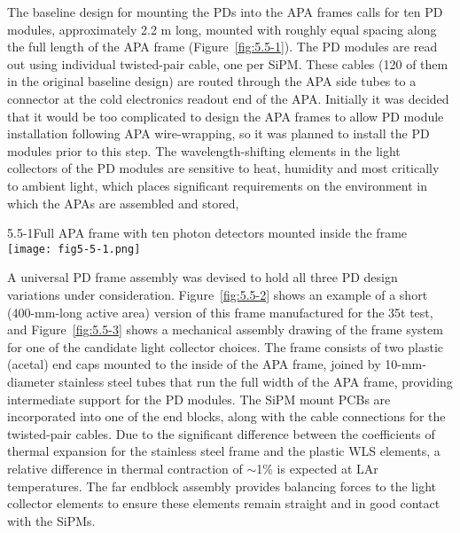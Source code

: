 The baseline  design for mounting the PDs into the APA frames calls for
ten PD modules, approximately 2.2 m long, mounted with roughly equal
spacing along the full length of the APA frame (Figure~\ref{fig:5.5-1}).  The
PD modules are read out using individual twisted-pair cable, one per
SiPM.  These cables (120 of them in the original baseline  design) are
routed through the APA side tubes to a connector at the cold
electronics readout end of the APA.  Initially it was decided that it
would be too complicated to design the APA frames to allow PD module
installation following APA wire-wrapping, so it was planned to install 
the PD modules %
prior to this step.%
The
wavelength-shifting elements in the light collectors of the PD modules
are sensitive to heat, humidity and most critically to %
ambient light, which places significant requirements  on the
environment in which the APAs are assembled and stored,%

\begin{cdrfigure}{5.5-1}{Full APA frame with ten photon detectors mounted
  inside the frame}
   \texttt{[image: fig5-5-1.png]}
\end{cdrfigure}

A universal PD frame assembly was devised to hold all three PD design
variations under consideration.  Figure~\ref{fig:5.5-2} shows an example of a
short (400-mm-long active area) version of this frame manufactured for
the 35t test,  and Figure~\ref{fig:5.5-3} shows a mechanical assembly drawing of
the frame system for one of the candidate light collector choices.
The frame consists of two plastic (acetal) end caps mounted to the
inside of the APA frame, joined by 10-mm-diameter stainless steel tubes
that run the full width of the APA frame, providing intermediate
support for the PD modules.%
The SiPM mount PCBs  are
incorporated into one of the end blocks, along with the cable
connections for the twisted-pair cables.  Due to the significant
difference between the coefficients of thermal expansion for the stainless
steel frame and the plastic WLS elements, %
a relative
difference in thermal contraction of $\sim$1\% is expected at LAr temperatures.  The
far endblock assembly provides balancing forces to the light collector
elements %
to ensure these elements remain %
straight and
in good contact with the SiPMs.

